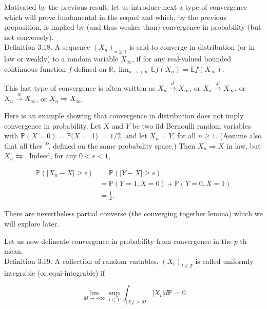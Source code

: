 \documentclass{amsbook}
\theoremstyle{plain}%
\theoremstyle{definition}
\theoremstyle{remark}
\begin{document}
Motivated by the previous result, let us introduce next a type of convergence which will prove fundamental in the sequel and which, by the previous proposition, is implied by (and thus weaker than) convergence in probability (but not conversely).\\
Definition 3.18. A sequence $\left(X_{n}\right)_{n \geq 1}$ is said to converge in distribution (or in law or weakly) to a random variable $X_{\infty}$, if for any real-valued bounded continuous function $f$ defined on $\mathbb{R}, \lim _{n \rightarrow+\infty} \mathbb{E} f\left(X_{n}\right)=\mathbb{E} f\left(X_{\infty}\right)$.

This last type of convergence is often written as $X_{n} \xrightarrow{d} X_{\infty}$, or $X_{n} \xrightarrow{\mathcal{L}} X_{\infty}$, or $X_{n} \xrightarrow{w} X_{\infty}$, or $X_{n} \Longrightarrow X_{\infty}$.

Here is an example showing that convergence in distribution does not imply convergence in probability, Let $X$ and $Y$ be two iid Bernoulli random variables with $\mathbb{P}(X=0)=\mathbb{P}(X=$ 1) $=1 / 2$, and let $X_{n}=Y$, for all $n \geq 1$. (Assume also that all thes ${ }^{P}$. defined on the same probability space.) Then $X_{n} \Rightarrow X$ in law, but $X_{n} \leftrightarrows$. Indeed, for any $0<\epsilon<1$,

$$
\begin{aligned}
  \mathbb{P}\left(\left|X_{n}-X\right| \geq \epsilon\right) & =\mathbb{P}(|Y-X| \geq \epsilon)           \\
  & =\mathbb{P}(Y=1, X=0)+\mathbb{P}(Y=0, X=1) \\
  & =\frac{1}{2} .
\end{aligned}
$$

There are nevertheless partial converse (the converging together lemma) which we will explore later.

Let us now delineate convergence in probability from convergence in the $p$ th mean.\\
Definition 3.19. A collection of random variables, $\left(X_{t}\right)_{t \in T}$ is called uniformly integrable (or equi-integrable) if

$$
\lim _{M \rightarrow+\infty} \sup _{t \in T} \int_{\left|X_{t}\right|>M}\left|X_{t}\right| d \mathbb{P}=0
$$
\end{document}
